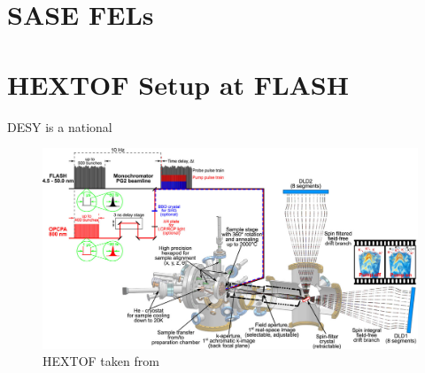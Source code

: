 \section{SASE FELs}

\section{HEXTOF Setup at FLASH}
\gls*{DESY} is a national 
\begin{figure}
    \centering
    \includegraphics[width=1\linewidth]{images/2024-08-27-10-50-01.png}
    \caption{HEXTOF taken from \cite{kutnyakhovTimeMomentumresolvedPhotoemission2020}}
\end{figure}


